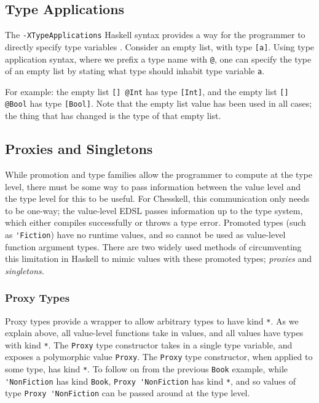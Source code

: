 \documentclass[12pt, a4paper, bibliography=totocnumbered]{scrreprt}
\newcommand{\inline}[1]{\lstinline[basicstyle=\ttfamily\footnotesize]{#1}}
\begin{document}

\subsection{Type Applications}

The \inline{-XTypeApplications} Haskell syntax provides a way for the programmer to directly specify type variables \cite{typeapplication}. Consider an empty list, with type \inline{[a]}. Using type application syntax, where we prefix a type name with \inline{@}, one can specify the type of an empty list by stating what type should inhabit type variable \inline{a}.

For example: the empty list \inline{[] @Int} has type \inline{[Int]}, and the empty list \inline{[] @Bool} has type \inline{[Bool]}. Note that the empty list value has been used in all cases; the thing that has changed is the type of that empty list.

\subsection{Proxies and Singletons}

While promotion and type families allow the programmer to compute at the type level, there must be some way to pass information between the value level and the type level for this to be useful. For Chesskell, this communication only needs to be one-way; the value-level EDSL passes information up to the type system, which either compiles successfully or throws a type error. Promoted types (such as \inline{'Fiction}) have no runtime values, and so cannot be used as value-level function argument types. There are two widely used methods of circumventing this limitation in Haskell to mimic values with these promoted types; \emph{proxies} and \emph{singletons}.

\subsubsection{Proxy Types}

Proxy types provide a wrapper to allow arbitrary types to have kind \inline{*}. As we explain above, all value-level functions take in values, and all values have types with kind \inline{*}. The \inline{Proxy} type constructor takes in a single type variable, and exposes a polymorphic value \inline{Proxy}. The \inline{Proxy} type constructor, when applied to some type, has kind \inline{*}. To follow on from the previous \inline{Book} example, while \inline{'NonFiction} has kind \inline{Book}, \inline{Proxy 'NonFiction} has kind \inline{*}, and so values of type \inline{Proxy 'NonFiction} can be passed around at the type level.
\end{document}
